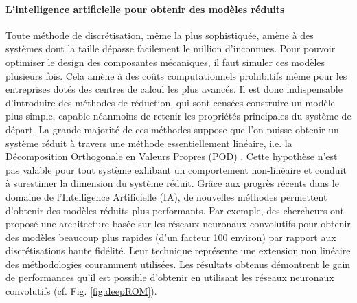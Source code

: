 \documentclass[12pt, french]{article}
\begin{document}
	\paragraph{\large L'intelligence artificielle pour obtenir des modèles réduits\\}
	Toute méthode de discrétisation, même la plus sophistiquée, amène à des systèmes dont la taille dépasse facilement le million d'inconnues. Pour pouvoir optimiser le design des composantes mécaniques, il faut simuler ces modèles plusieurs fois. Cela amène à des coûts computationnels prohibitifs même pour les entreprises dotés des centres de calcul les plus avancés. Il est donc indispensable d'introduire des méthodes de réduction, qui sont censées construire un modèle plus simple, capable néanmoins de retenir les propriétés principales du système de départ. La grande majorité de ces méthodes suppose que l'on puisse obtenir un système réduit à travers une méthode essentiellement linéaire, i.e. la Décomposition Orthogonale en Valeurs Propres (POD) \cite{shinde2019,tello2020fluid}. Cette hypothèse n'est pas valable pour tout système exhibant un comportement non-linéaire et conduit à surestimer la dimension du système réduit. Grâce aux progrès récents dans le domaine de l'Intelligence Artificielle (IA), de nouvelles méthodes permettent d'obtenir des modèles réduits plus performants. Par exemple, des chercheurs ont proposé une architecture basée sur les réseaux neuronaux convolutifs \cite{lee2020} pour obtenir des modèles beaucoup plus rapides (d'un facteur 100 environ) par rapport aux discrétisations haute fidélité. Leur technique représente une extension non linéaire des méthodologies couramment utilisées. Les résultats obtenus démontrent le gain de performances qu'il est possible d'obtenir en utilisant les réseaux neuronaux convolutifs (cf. Fig. \ref{fig:deepROM}).
	
\end{document}

